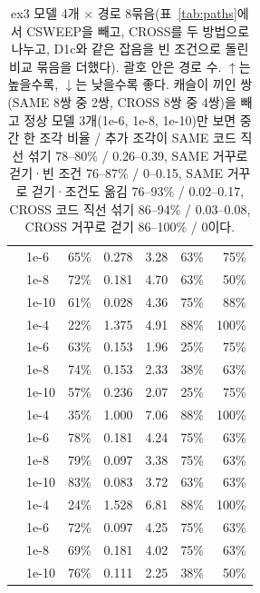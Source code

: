 \documentclass[11pt]{article}
\begin{document}
\begin{table}[p]
\begin{tabular}{l l r r r r r}
 & 1e-6 & 65\% & 0.278 & 3.28 & 63\% & 75\% \\
 & 1e-8 & 72\% & 0.181 & 4.70 & 63\% & 50\% \\
 & 1e-10 & 61\% & 0.028 & 4.36 & 75\% & 88\% \\
\midrule
{}
 & 1e-4 & 22\% & 1.375 & 4.91 & 88\% & 100\% \\
 & 1e-6 & 63\% & 0.153 & 1.96 & 25\% & 75\% \\
 & 1e-8 & 74\% & 0.153 & 2.33 & 38\% & 63\% \\
 & 1e-10 & 57\% & 0.236 & 2.07 & 25\% & 75\% \\
\midrule
{}
 & 1e-4 & 35\% & 1.000 & 7.06 & 88\% & 100\% \\
 & 1e-6 & 78\% & 0.181 & 4.24 & 75\% & 63\% \\
 & 1e-8 & 79\% & 0.097 & 3.38 & 75\% & 63\% \\
 & 1e-10 & 83\% & 0.083 & 3.72 & 63\% & 63\% \\
\midrule
{}
 & 1e-4 & 24\% & 1.528 & 6.81 & 88\% & 100\% \\
 & 1e-6 & 72\% & 0.097 & 4.25 & 75\% & 63\% \\
 & 1e-8 & 69\% & 0.181 & 4.02 & 75\% & 63\% \\
 & 1e-10 & 76\% & 0.111 & 2.25 & 38\% & 50\% \\
\bottomrule
\end{tabular}
\caption{ex3 모델 4개 $\times$ 경로 8묶음(표~\ref{tab:paths}에서 CSWEEP을 빼고, CROSS를 두 방법으로 나누고, D1c와 같은 잡음을 빈 조건으로 돌린 비교 묶음을 더했다). 괄호 안은 경로 수. $\uparrow$는 높을수록, $\downarrow$는 낮을수록 좋다.
캐슬이 끼인 쌍(SAME 8쌍 중 2쌍, CROSS 8쌍 중 4쌍)을 빼고 정상 모델 3개(1e-6, 1e-8, 1e-10)만 보면
중간 한 조각 비율 / 추가 조각이 SAME 코드 직선 섞기 78--80\% / 0.26--0.39, SAME 거꾸로 걷기·빈 조건 76--87\% / 0--0.15,
SAME 거꾸로 걷기·조건도 옮김 76--93\% / 0.02--0.17, CROSS 코드 직선 섞기 86--94\% / 0.03--0.08, CROSS 거꾸로 걷기 86--100\% / 0이다.}
\label{tab:four}
\end{table}
\end{document}
